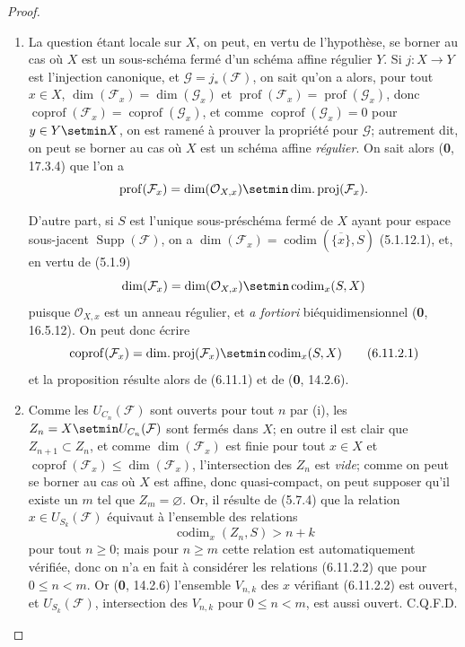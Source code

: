 \begin{proof}
\begin{enumerate}
\item[(i)] La question étant locale sur $X$, on peut, en vertu de
l'hypothèse, se borner au cas où $X$ est un sous-schéma fermé d'un schéma
affine régulier $Y$. Si $j:X\to Y$ est l'injection canonique, et
$\mathcal G=j_*(\mathcal F)$, on sait qu'on a alors, pour tout $x\in X$,
$\dim(\mathcal F_x)=\dim(\mathcal G_x)$ et
$\operatorname{prof}(\mathcal F_x)=\operatorname{prof}(\mathcal G_x)$,
donc $\operatorname{coprof}(\mathcal F_x)=
\operatorname{coprof}(\mathcal G_x)$, et comme
$\operatorname{coprof}(\mathcal G_x)=0$ pour $y\in Y\setmin X$, on est ramené à
prouver la propriété pour $\mathcal G$; autrement dit, on peut se borner au
cas où $X$ est un schéma affine \emph{régulier}. On sait alors (\textbf{0}, 17.3.4) que
l'on a
\[
\operatorname{prof}(\mathcal F_x)=\dim(\mathcal O_{X,x})\setmin
\operatorname{dim.proj}(\mathcal F_x).
\]

D'autre part, si $S$ est l'unique sous-préschéma fermé de $X$ ayant pour
espace sous-jacent $\operatorname{Supp}(\mathcal F)$, on a
$\dim(\mathcal F_x)=\operatorname{codim}(\overline{\{x\}},S)$ (5.1.12.1), et, en
vertu de (5.1.9)
\[
\dim(\mathcal F_x)=\dim(\mathcal O_{X,x})\setmin\operatorname{codim}_x(S,X)
\]
puisque $\mathcal O_{X,x}$ est un anneau régulier, et \emph{a fortiori}
biéquidimensionnel (\textbf{0}, 16.5.12). On peut donc écrire
\begin{equation}
\operatorname{coprof}(\mathcal F_x)=
\operatorname{dim.proj}(\mathcal F_x)\setmin\operatorname{codim}_x(S,X)
\tag{6.11.2.1}\label{IV.2.s6.11.2.1-fr}
\end{equation}
et la proposition résulte alors de (6.11.1) et de (\textbf{0}, 14.2.6).

\item[(ii)] Comme les $U_{C_n}(\mathcal F)$ sont ouverts pour tout $n$ par
(i), les $Z_n=X\setmin U_{C_n}(\mathcal F)$ sont fermés dans $X$; en outre il est
clair que $Z_{n+1}\subset Z_n$, et comme $\dim(\mathcal F_x)$ est finie
pour tout $x\in X$ et
$\operatorname{coprof}(\mathcal F_x)\leq\dim(\mathcal F_x)$,
l'intersection des $Z_n$ est \emph{vide}; comme on peut se borner au cas où $X$
est affine, donc quasi-compact, on peut supposer qu'il existe un $m$
tel que $Z_m=\varnothing$. Or, il résulte de (5.7.4) que la relation
$x\in U_{S_k}(\mathcal F)$ équivaut à l'ensemble des relations
\begin{equation}
\operatorname{codim}_x(Z_n,S)>n+k
\tag{6.11.2.2}\label{IV.2.s6.11.2.2-fr}
\end{equation}
pour tout $n\geq0$; mais pour $n\geq m$ cette relation est automatiquement
vérifiée, donc on n'a en fait à considérer les relations (6.11.2.2) que
pour $0\leq n<m$. Or (\textbf{0}, 14.2.6) l'ensemble $V_{n,k}$ des $x$ vérifiant
(6.11.2.2) est ouvert, et $U_{S_k}(\mathcal F)$, intersection des $V_{n,k}$
pour $0\leq n<m$, est aussi ouvert. C.Q.F.D.
\end{enumerate}
\end{proof}

